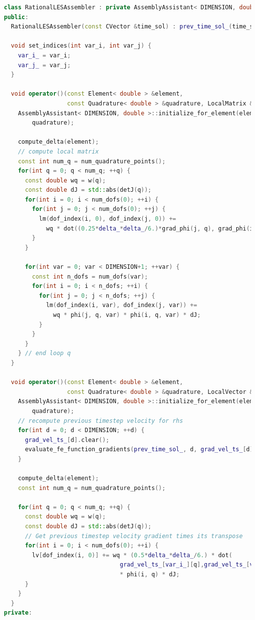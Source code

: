 \documentclass[a4paper, 11pt, twoside]{article}
\begin{document}
\begin{lstlisting}[language=C++, basicstyle={\footnotesize, \ttfamily}, keywordstyle=\color{blue},  numbers=none, tabsize=2]
class RationalLESAssembler : private AssemblyAssistant< DIMENSION, double > {
public:
  RationalLESAssembler(const CVector &time_sol) : prev_time_sol_(time_sol) {}

  void set_indices(int var_i, int var_j) {
    var_i_ = var_i;
    var_j_ = var_j;
  }

  void operator()(const Element< double > &element,
                  const Quadrature< double > &quadrature, LocalMatrix &lm) {
    AssemblyAssistant< DIMENSION, double >::initialize_for_element(element,
        quadrature);

    compute_delta(element);
    // compute local matrix
    const int num_q = num_quadrature_points();
    for(int q = 0; q < num_q; ++q) {
      const double wq = w(q);
      const double dJ = std::abs(detJ(q));
      for(int i = 0; i < num_dofs(0); ++i) {
        for(int j = 0; j < num_dofs(0); ++j) {
          lm(dof_index(i, 0), dof_index(j, 0)) +=
            wq * dot((0.25*delta_*delta_/6.)*grad_phi(j, q), grad_phi(i, q)) * dJ;
        }
      }

      for(int var = 0; var < DIMENSION+1; ++var) {
        const int n_dofs = num_dofs(var);
        for(int i = 0; i < n_dofs; ++i) {
          for(int j = 0; j < n_dofs; ++j) {
            lm(dof_index(i, var), dof_index(j, var)) +=
              wq * phi(j, q, var) * phi(i, q, var) * dJ;
          }
        }
      }
    } // end loop q
  }
  
  void operator()(const Element< double > &element,
                  const Quadrature< double > &quadrature, LocalVector &lv) {
    AssemblyAssistant< DIMENSION, double >::initialize_for_element(element,
        quadrature);
    // recompute previous timestep velocity for rhs
    for(int d = 0; d < DIMENSION; ++d) {
      grad_vel_ts_[d].clear();
      evaluate_fe_function_gradients(prev_time_sol_, d, grad_vel_ts_[d]);
    }

    compute_delta(element);
    const int num_q = num_quadrature_points();

    for(int q = 0; q < num_q; ++q) {
      const double wq = w(q);
      const double dJ = std::abs(detJ(q));
      // Get previous timestep velocity gradient times its transpose
      for(int i = 0; i < num_dofs(0); ++i) {
        lv[dof_index(i, 0)] += wq * (0.5*delta_*delta_/6.) * dot(
                                 grad_vel_ts_[var_i_][q],grad_vel_ts_[var_j_][q])
                                 * phi(i, q) * dJ;
      }
    }
  }
private:


\end{lstlisting}
\end{document}
